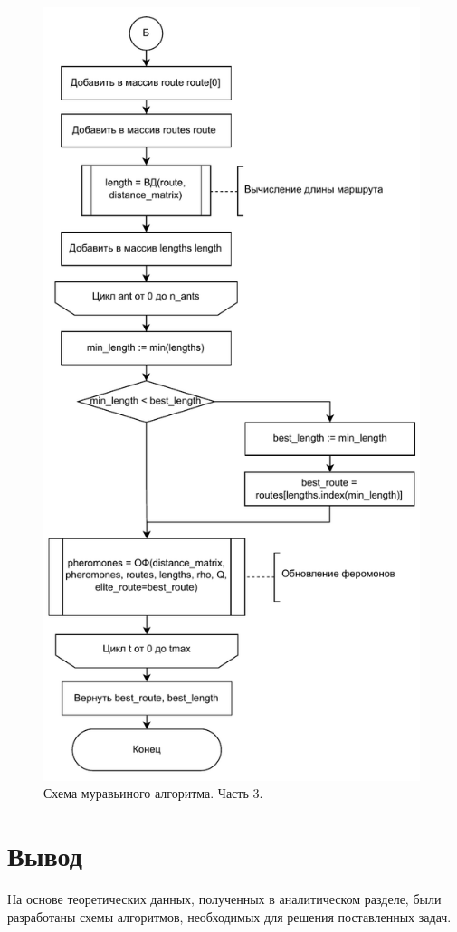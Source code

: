 \begin{figure}[H]
    \centering
    \includegraphics[width=110mm]{images/ant_3}
    \caption{Схема муравьиного алгоритма. Часть 3.}
    \label{images:ant_3}
\end{figure}

\section*{Вывод}

На основе теоретических данных, полученных в аналитическом разделе, были разработаны схемы алгоритмов, необходимых для решения поставленных задач.

